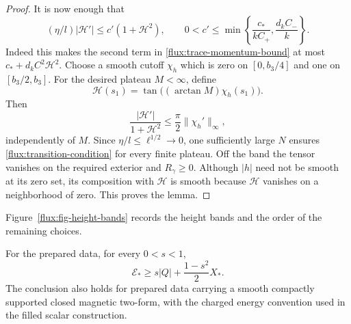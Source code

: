 \begin{proof}
It is now enough that
\begin{equation}
 (\eta/l)|\mathcal H'|\leq c'(1+\mathcal H^2),
 \qquad
 0<c'\leq
 \min\left\{\frac{c_*}{kC_+},\frac{d_kC_-}{k}\right\}.
 \label{flux:transition-condition}
\end{equation}
Indeed this makes the second term in \eqref{flux:trace-momentum-bound}
at most $c_*+d_kC^2\mathcal H^2$.
Choose a smooth cutoff $\chi_h$ which is zero on $[0,b_3/4]$ and one on
$[b_3/2,b_3]$.  For the desired plateau $M<\infty$, define
\begin{equation}
 \mathcal H(s_1)=\tan\bigl((\arctan M)\chi_h(s_1)\bigr).
 \label{flux:arctan-ramp}
\end{equation}
Then
\begin{equation}
 \frac{|\mathcal H'|}{1+\mathcal H^2}
 \leq\frac\pi2\|\chi_h'\|_\infty,
 \label{flux:ramp-uniformity}
\end{equation}
independently of $M$.  Since $\eta/l\leq\ell^{1/2}\to0$, one sufficiently
large $N$ ensures \eqref{flux:transition-condition} for every finite
plateau.  Off the band the tensor vanishes on the required exterior and
$R_\gamma\geq0$.  Although $|h|$ need not be smooth at its zero set, its
composition with $\mathcal H$ is smooth because $\mathcal H$ vanishes on a
neighborhood of zero.  This proves the lemma.
\end{proof}

Figure~\ref{flux:fig-height-bands} records the height bands and the
order of the remaining choices.


\begin{proposition}
\label{flux:prepared-bound}
For the prepared data, for every $0<s<1$,
\begin{equation}
 \mathcal E_*\geq s|Q|+\frac{1-s^2}{2}X_*.
 \label{flux:prepared-inequality}
\end{equation}
The conclusion also holds for prepared data carrying a smooth compactly
supported closed magnetic two-form, with the charged energy convention
used in the filled scalar construction.
\end{proposition}


